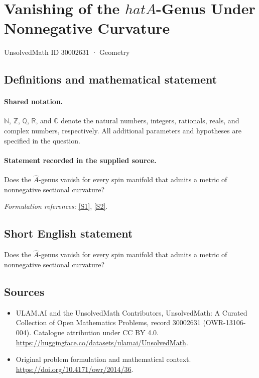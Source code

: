 \documentclass[11pt]{article}
\newcommand{\sref}[2]{\hyperlink{source:#1:#2}{[S#2]}}
\begin{document}
\setcounter{section}{30002630}
\section{\texorpdfstring{Vanishing of the $hat A$-Genus Under Nonnegative Curvature}{Vanishing of the hat A-Genus Under Nonnegative Curvature}}\label{30002631}
{\small UnsolvedMath ID 30002631 · Geometry}
\subsection{Definitions and mathematical statement}

\paragraph{Shared notation.}$\mathbb N$, $\mathbb Z$, $\mathbb Q$, $\mathbb R$, and $\mathbb C$ denote the natural numbers, integers, rationals, reals, and complex numbers, respectively. All additional parameters and hypotheses are specified in the question.


\paragraph{Statement recorded in the supplied source.}
Does the $\hat A$-genus vanish for every spin manifold that admits a metric of nonnegative sectional curvature?
\par\smallskip\textit{Formulation references:} \sref{30002631}{1}, \sref{30002631}{2}.
\subsection{Short English statement}
Does the $\hat A$-genus vanish for every spin manifold that admits a metric of nonnegative sectional curvature?
\subsection{Sources}
\begin{itemize}
\item[\hypertarget{source:30002631:1}{S1}] ULAM.AI and the UnsolvedMath Contributors, UnsolvedMath: A Curated Collection of Open Mathematics Problems, record 30002631 (OWR-13106-004). Catalogue attribution under CC BY 4.0.
\url{https://huggingface.co/datasets/ulamai/UnsolvedMath}.
\item[\hypertarget{source:30002631:2}{S2}] Original problem formulation and mathematical context.
\url{https://doi.org/10.4171/owr/2014/36}.
\end{itemize}
\label{end:30002631}
\end{document}
